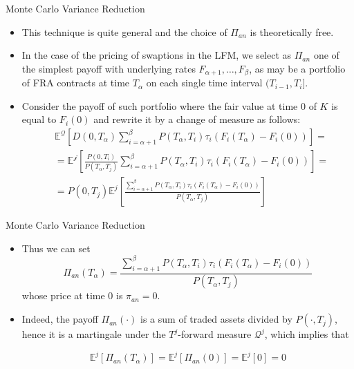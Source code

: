 \documentclass{beamer}
\begin{document}
\begin{frame}{Monte Carlo Variance Reduction}
  \begin{itemize}
  \item This technique is quite general and the choice of $\Pi_{an}$ is theoretically free.
  \item In the case of the pricing of swaptions in the LFM, we select as $\Pi_{an}$ one of the simplest payoff with underlying rates $F_{\alpha+1},\ldots,F_\beta$, as may be a portfolio of FRA contracts at time $T_\alpha$ on each single time interval $(T_{i-1}, T_i]$.
  \item Consider the payoff of such portfolio where the fair value at time 0 of $K$ is equal to $F_i(0)$ and rewrite it by a change of measure as follows:
    \begin{equation*}
      \begin{aligned}
        &\mathbb{E}^\mathcal{Q}\left[D(0,T_\alpha)\sum_{i=\alpha+1}^\beta P(T_\alpha,T_i)\tau_i(F_i(T_\alpha) - F_i(0))\right] = \\
        &=\mathbb{E}^\mathcal{j}\left[\frac{P(0,T_i)}{P(T_\alpha,T_j)}\sum_{i=\alpha+1}^\beta P(T_\alpha,T_i)\tau_i(F_i(T_\alpha) - F_i(0))\right] = \\
        & = P(0,T_j)\mathbb{E}^j\left[\frac{\sum_{i=\alpha+1}^\beta P(T_\alpha,T_i)\tau_i(F_i(T_\alpha) - F_i(0))}{P(T_\alpha,T_j)}\right]
      \end{aligned}
    \end{equation*}
  \end{itemize}
\end{frame}

\begin{frame}{Monte Carlo Variance Reduction}
  \begin{itemize}
  \item Thus we can set
    \begin{equation*}
      \Pi_{an}(T_\alpha) = \frac{\sum_{i=\alpha+1}^\beta P(T_\alpha,T_i)\tau_i(F_i(T_\alpha) - F_i(0))}{P(T_\alpha,T_j)}
    \end{equation*}
    whose price at time 0 is $\pi_{an} = 0$.
  \item  Indeed, the payoff $\Pi_{an}(\cdot)$ is a sum of traded assets divided by $P(\cdot, T_j)$, hence it is a martingale under the $T^j$-forward measure $\mathcal{Q}^j$, which implies that
    
    \begin{equation*}
      \mathbb{E}^j[\Pi_{an}(T_\alpha)] = \mathbb{E}^j[\Pi_{an}(0)] = \mathbb{E}^j[0] = 0
    \end{equation*}
  \end{itemize}
\end{frame}
\end{document}
